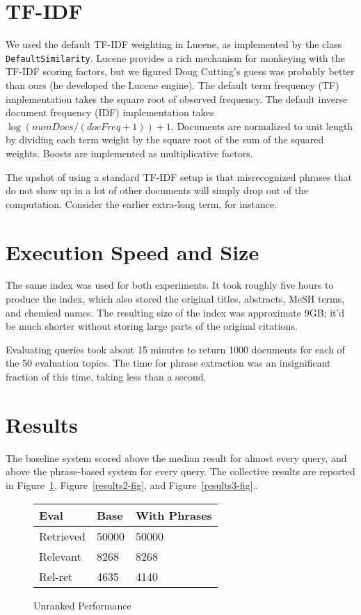 \documentclass[11pt,oneside]{article}
\begin{document}
\section*{TF-IDF}

We used the default TF-IDF weighting in Lucene, as implemented by the
class {\tt DefaultSimilarity}.  Lucene provides a rich mechanism for
monkeying with the TF-IDF scoring factors, but we figured Doug
Cutting's guess was probably better than ours (he developed the Lucene
engine). The default term frequency (TF) implementation takes the
square root of observed frequency.  The default inverse document
frequency (IDF) implementation takes $\log(numDocs/(docFreq+1)) + 1$.
Documents are normalized to unit length by dividing each term weight
by the square root of the sum of the squared weights.  Boosts are
implemented as multiplicative factors.

The upshot of using a standard TF-IDF setup is that misrecognized
phrases that do not show up in a lot of other documents will simply
drop out of the computation.  Consider the earlier extra-long term,
for instance.


\section*{Execution Speed and Size}

The same index was used for both experiments.  It took roughly five
hours to produce the index, which also stored the original titles,
abstracts, MeSH terms, and chemical names.  The resulting size of
the index was approximate 9GB; it'd be much shorter without storing
large parts of the original citations.  

Evaluating queries took about 15 minutes to return 1000 documents for
each of the 50 evaluation topics.  The time for phrase extraction was an
insignificant fraction of this time, taking less than a second.



\section*{Results}

The baseline system scored above the median result for almost every
query, and above the phrase-based system for every query.  The
collective results are reported in Figure~\ref{results1-fig},
Figure~\ref{results2-fig}, and Figure~\ref{results3-fig}..

\begin{figure}
\begin{center}	
\begin{tabular}{|l|l|l|}
\hline
Eval & Base & With Phrases 
\\
\hline
Retrieved & 50000 & 50000 \\
Relevant & 8268 & 8268 \\
Rel-ret  & 4635 & 4140 \\
\hline
\end{tabular}
\end{center}
\caption{Unranked Performance}
\label{results1-fig}
\end{figure}
\end{document}
